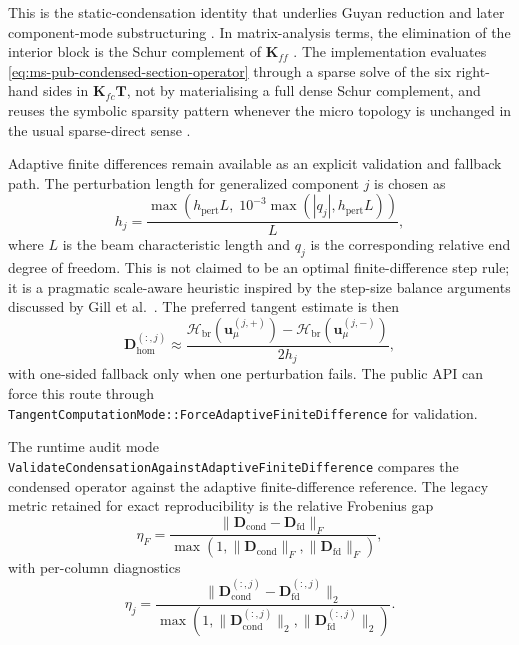This is the static-condensation identity that underlies Guyan reduction and
later component-mode substructuring
\cite{Guyan1965,CraigBampton1968}.  In matrix-analysis terms, the elimination
of the interior block is the Schur complement of \(\mathbf{K}_{ff}\)
\cite{Zhang2005Schur}.  The implementation evaluates
\eqref{eq:ms-pub-condensed-section-operator} through a sparse solve of the six
right-hand sides in \(\mathbf{K}_{fc}\mathbf{T}\), not by materialising a full
dense Schur complement, and reuses the symbolic sparsity pattern whenever the
micro topology is unchanged in the usual sparse-direct sense
\cite{Davis2006Sparse}.

Adaptive finite differences remain available as an explicit validation and
fallback path.  The perturbation length for generalized component \(j\) is
chosen as
\begin{equation}
  h_j
  =
  \frac{\max\!\left(h_{\mathrm{pert}}L,\;
    10^{-3}\max(|q_j|, h_{\mathrm{pert}}L)\right)}{L},
  \label{eq:ms-pub-adaptive-step}
\end{equation}
where \(L\) is the beam characteristic length and \(q_j\) is the corresponding
relative end degree of freedom.  This is not claimed to be an optimal
finite-difference step rule; it is a pragmatic scale-aware heuristic inspired
by the step-size balance arguments discussed by
Gill et al.~\cite{GillMurraySaundersWright1983}.  The preferred tangent
estimate is then
\begin{equation}
  \mathbf{D}_{\mathrm{hom}}^{(:,j)}
  \approx
  \frac{\mathcal{H}_{\mathrm{br}}(\mathbf{u}_{\mu}^{(j,+)})
        - \mathcal{H}_{\mathrm{br}}(\mathbf{u}_{\mu}^{(j,-)})}{2h_j},
  \label{eq:ms-pub-central-fd}
\end{equation}
with one-sided fallback only when one perturbation fails.  The public API can
force this route through
\texttt{TangentComputationMode::ForceAdaptiveFiniteDifference} for validation.

The runtime audit mode
\texttt{ValidateCondensationAgainstAdaptiveFiniteDifference} compares the
condensed operator against the adaptive finite-difference reference.  The
legacy metric retained for exact reproducibility is the relative Frobenius gap
\begin{equation}
  \eta_{F}
  =
  \frac{\lVert \mathbf{D}_{\mathrm{cond}}
         - \mathbf{D}_{\mathrm{fd}} \rVert_F}
       {\max\!\left(1,
           \lVert \mathbf{D}_{\mathrm{cond}} \rVert_F,
           \lVert \mathbf{D}_{\mathrm{fd}} \rVert_F\right)},
  \label{eq:ms-pub-validation-gap}
\end{equation}
with per-column diagnostics
\begin{equation}
  \eta_j
  =
  \frac{\lVert \mathbf{D}_{\mathrm{cond}}^{(:,j)}
         - \mathbf{D}_{\mathrm{fd}}^{(:,j)} \rVert_2}
       {\max\!\left(1,
           \lVert \mathbf{D}_{\mathrm{cond}}^{(:,j)} \rVert_2,
           \lVert \mathbf{D}_{\mathrm{fd}}^{(:,j)} \rVert_2\right)}.
  \label{eq:ms-pub-validation-column-gap}
\end{equation}

